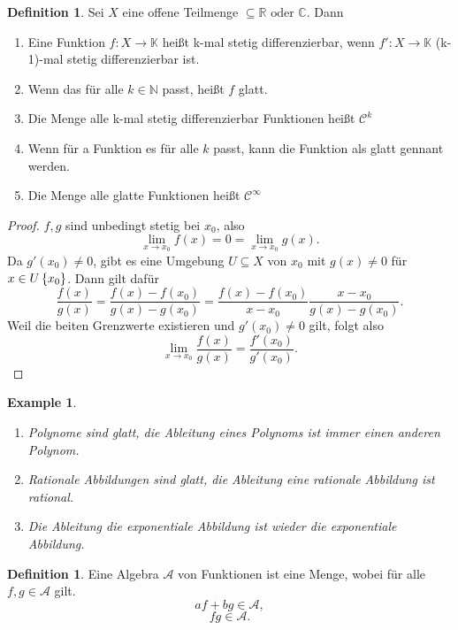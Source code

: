 \documentclass[prb,12pt]{revtex4-2}
\newtheorem{Example}[Theorem]{Example}
\theoremstyle{definition}
\theoremstyle{definition}
\newtheorem{Definition}[Theorem]{Definition}
\newcommand{\R}{\mathbb{R}}
\newcommand{\C}{\mathbb{C}}
\begin{document}
\begin{Definition}
	Sei $X$ eine offene Teilmenge $\subseteq \R\text{ oder }\C$. Dann
	\begin{enumerate}
		\item Eine Funktion $f:X\to \mathbb{K}$ heißt k-mal stetig differenzierbar, wenn $f':X\to \mathbb{K}$ (k-1)-mal stetig differenzierbar ist.
		\item Wenn das f\"{u}r alle $k\in \mathbb{N}$ passt, heißt $f$ glatt.
		\item Die Menge alle k-mal stetig differenzierbar Funktionen heißt $\mathcal{C}^k$
		\item Wenn f\"{u}r a Funktion es f\"{u}r alle $k$ passt, kann die Funktion als glatt gennant werden.
		\item Die Menge alle glatte Funktionen heißt $\mathcal{C}^\infty$
	\end{enumerate}
\end{Definition}
\begin{proof}
	$f,g$ sind unbedingt stetig bei $x_0$, also
	\[
	\lim_{x \to x_0} f(x)=0=\lim_{x \to x_0} g(x)
	.\] 
	Da $g'(x_0)\neq 0$, gibt es eine Umgebung $U\subseteq X$ von $x_0$ mit $g(x)\neq 0$ f\"{u}r $x\in U\\ \left\{ x_0 \right\} $. Dann gilt daf\"{u}r
	\[
		\frac{f(x)}{g(x)}=\frac{f(x)-f(x_0)}{g(x)-g(x_0)}=\frac{f(x)-f(x_0)}{x-x_0}\frac{x-x_0}{g(x)-g(x_0)}
	.\] 
Weil die beiten Grenzwerte existieren und $g'(x_0)\neq 0$ gilt, folgt also
\[
\lim_{x \to x_0} \frac{f(x)}{g(x)}=\frac{f'(x_0)}{g'(x_0)}
.\] 
\end{proof}
\begin{Example}
	\begin{enumerate}
		\item Polynome sind glatt, die Ableitung eines Polynoms ist immer einen anderen Polynom.
		\item Rationale Abbildungen sind glatt, die Ableitung eine rationale Abbildung ist rational.
		\item Die Ableitung die exponentiale Abbildung ist wieder die exponentiale Abbildung.
	\end{enumerate}
\end{Example}

\begin{Definition}
	Eine Algebra $\mathcal{A}$ von Funktionen ist eine Menge, wobei f\"{u}r alle $f,g\in \mathcal{A}$ gilt.
 \[
	 af+bg\in \mathcal{A},\]
	 \[
		 fg\in \mathcal{A}
	 .\] 
\end{Definition}
\end{document}
